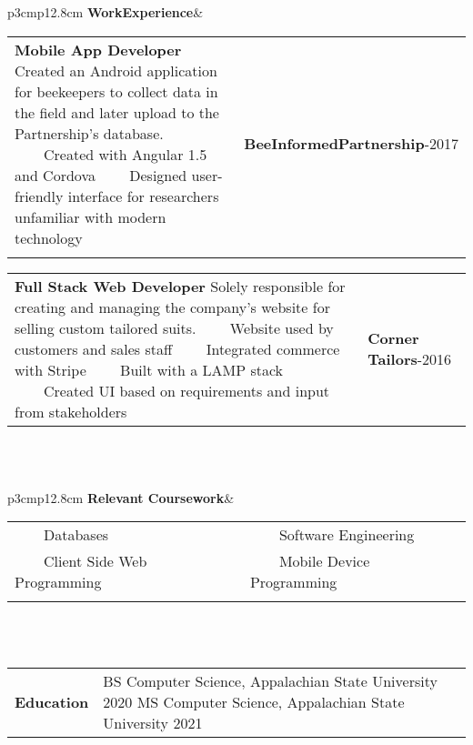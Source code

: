 \documentclass[a4paper, 12pt]{article}
\newcommand{\tabitem}{~~\llap{\textbullet}~~}
\newcommand{\sechead}[1]{\fontsize{14}{22}\textbf{#1}}
\begin{document}
\begin{tabular}[t]{p{3cm}p{12.8cm}}
\vspace{.1cm}\sechead{Work}\newline\sechead{Experience}&
    \begin{tabular}[t]{p{8.8cm}p{4cm}}
        \textbf{Mobile App Developer}\newline
        Created an Android application for beekeepers to collect data in the field and later upload to the Partnership’s database.\newline
        \tabitem Created with Angular 1.5 and Cordova \newline
        \tabitem Designed user-friendly interface for researchers unfamiliar with modern technology
        & \textbf{BeeInformed}\newline \textbf{Partnership}\newline 2016-2017 \\& 
    \end{tabular}
    \begin{tabular}[t]{p{8.8cm}p{4cm}}
        \textbf{Full Stack Web Developer}\newline
        Solely responsible for creating and managing the company’s website for selling custom tailored suits.\newline
        \tabitem Website used by customers and sales staff \newline
        \tabitem Integrated commerce with Stripe \newline
        \tabitem Built with a LAMP stack \newline
        \tabitem Created UI based on requirements and input from stakeholders
        & \textbf{Corner Tailors}\newline 2014-2016 \\
    \end{tabular}
\end{tabular}
\\\\

\begin{tabular}[t]{p{3cm}p{12.8cm}}
    \vspace{.1cm}\sechead{Relevant Coursework}&
    \begin{tabular}[t]{p{6.4cm}p{6.4cm}}
        \vspace{.04pt}\tabitem Databases & \vspace{.04pt}\tabitem Software Engineering \\
        \tabitem Client Side Web Programming & \tabitem Mobile Device Programming
        \\\\
    \end{tabular}
\end{tabular}
\\\\

\begin{tabular}[t]{p{3cm}p{12.8cm}}
\cellcolor{pale-sapphire}\vspace{.1cm}\sechead{Education} & \vspace{.1cm}
BS Computer Science, Appalachian State University 2020 \newline
MS Computer Science, Appalachian State University 2021 \newline
\end{tabular}
\end{document}

